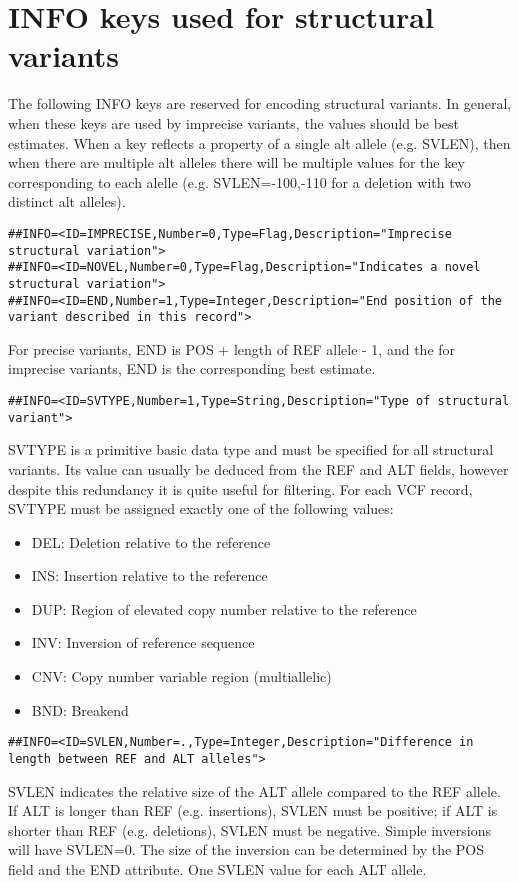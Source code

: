 \documentclass[8pt]{article}
\begin{document}
\section{INFO keys used for structural variants}
\label{sv-info-keys}
The following INFO keys are reserved for encoding structural variants. In general, when these keys are used by imprecise variants, the values should be best estimates. When a key reflects a property of a single alt allele (e.g. SVLEN), then when there are multiple alt alleles there will be multiple values for the key corresponding to each alelle (e.g. SVLEN=-100,-110 for a deletion with two distinct alt alleles).
\footnotesize
\begin{verbatim}
##INFO=<ID=IMPRECISE,Number=0,Type=Flag,Description="Imprecise structural variation">
##INFO=<ID=NOVEL,Number=0,Type=Flag,Description="Indicates a novel structural variation">
##INFO=<ID=END,Number=1,Type=Integer,Description="End position of the variant described in this record">
\end{verbatim}
\normalsize
For precise variants, END is POS + length of REF allele - 1, and the for imprecise variants, END is the corresponding best estimate.

\footnotesize
\begin{verbatim}
##INFO=<ID=SVTYPE,Number=1,Type=String,Description="Type of structural variant">
\end{verbatim}
\normalsize
SVTYPE is a primitive basic data type and must be specified for all structural variants. Its value can usually be deduced from the REF and ALT fields, however despite this redundancy it is quite useful for filtering. For each VCF record, SVTYPE must be assigned exactly one of the following values:

\begin{itemize}
\item DEL:  Deletion relative to the reference
\item INS:  Insertion relative to the reference
\item DUP:  Region of elevated copy number relative to the reference
\item INV:  Inversion of reference sequence
\item CNV:  Copy number variable region (multiallelic)
\item BND:  Breakend
\end{itemize}

\footnotesize
\begin{verbatim}
##INFO=<ID=SVLEN,Number=.,Type=Integer,Description="Difference in length between REF and ALT alleles">
\end{verbatim}
\normalsize
SVLEN indicates the relative size of the ALT allele compared to the REF allele. If ALT is longer than REF (e.g. insertions), SVLEN must be positive; if ALT is shorter than REF (e.g. deletions), SVLEN must be negative. Simple inversions will have SVLEN=0. The size of the inversion can be determined by the POS field and the END attribute. One SVLEN value for each ALT allele.
\end{document}
